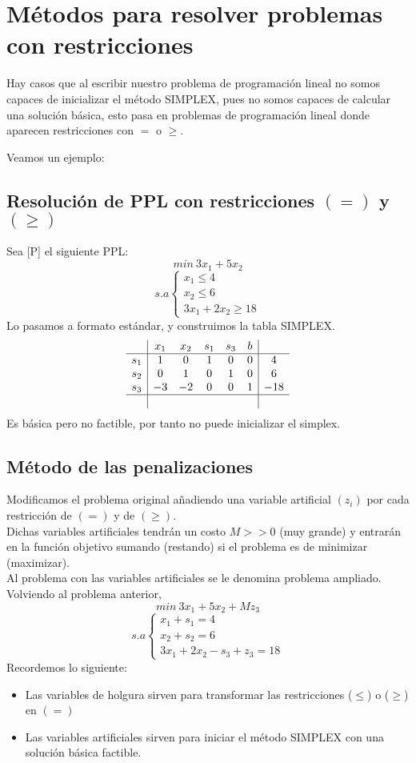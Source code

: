 \section{Métodos para resolver problemas con restricciones}
Hay casos que al escribir nuestro problema de programación lineal no
somos capaces de inicializar el método SIMPLEX, pues no somos capaces
de calcular una solución básica, esto pasa en problemas de
programación lineal donde aparecen restricciones con $=$ o $\geq$.

Veamos un ejemplo:

\subsection{Resolución de PPL con restricciones $(=)$ y $(\geq)$}

Sea [P] el siguiente PPL:
$$ min ~ 3x_1+5x_2 $$
$$ s.a \left\{
  \begin{array}{c}
    x_1 \leq 4 \\
    x_2 \leq 6 \\
    3x_1+2x_2 \geq 18
  \end{array}
\right.
$$
Lo pasamos a formato estándar, y construimos la tabla SIMPLEX.
$$
\begin{array}{c|ccccc|c} 
  & x_1 & x_2 & s_1 & s_3 & b \\ \hline
  s_1 & 1 & 0 & 1 & 0 & 0 & 4 \\
  s_2 & 0 & 1 & 0 & 1 & 0 & 6 \\
  s_3 & -3 & -2 & 0 & 0 & 1 & -18 \\ \hline
  & & & & &
\end{array}
$$
Es básica pero no factible, por tanto no puede inicializar el simplex.

\subsection{Método de las penalizaciones}
Modificamos el problema original añadiendo una variable artificial $(z_i)$ por cada restricción de $(=)$ y de $(\geq)$. \\
Dichas variables artificiales tendrán un costo $M>>0$ (muy grande) y entrarán en la función objetivo sumando (restando) si el problema es de minimizar (maximizar). \\
Al problema con las variables artificiales se le denomina problema ampliado. \\

Volviendo al problema anterior, 
$$ min ~ 3x_1+5x_2+M z_3 $$
$$ s.a \left\{
  \begin{array}{c}
    x_1+s_1=4 \\
    x_2 + s_2 = 6 \\
    3x_1+2x_2-s_3+z_3=18
  \end{array}
\right.
$$
Recordemos lo siguiente:
\begin{itemize}
  \item Las variables de holgura sirven para transformar las restricciones ($\leq$) o ($\geq$) en $(=)$
  \item Las variables artificiales sirven para iniciar el método SIMPLEX con una solución básica factible.
\end{itemize}

